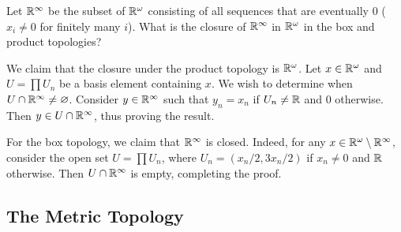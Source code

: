 	\begin{exercise}
		Let $\mathbb{R}^\infty$ be the subset of $\mathbb{R}^\omega$ consisting of all sequences that are eventually $0$ ($x_i\neq 0$ for finitely many $i$). What is the closure of $\mathbb{R}^\infty$ in $\mathbb{R}^\omega$ in the box and product topologies?
	\end{exercise}
	\begin{solution*}
		We claim that the closure under the product topology is $\mathbb{R}^\omega$. Let $x\in\mathbb{R}^\omega$ and $U=\prod U_n$ be a basis element containing $x$. We wish to determine when $U\cap\mathbb{R}^\infty\neq\varnothing$. Consider $y\in\mathbb{R}^\infty$ such that $y_n = x_n$ if $U_n\neq\mathbb{R}$ and $0$ otherwise. Then $y\in U\cap\mathbb{R}^\infty$, thus proving the result.

		For the box topology, we claim that $\mathbb{R}^\infty$ is closed. Indeed, for any $x\in\mathbb{R}^\omega\setminus\mathbb{R}^\infty$, consider the open set $U=\prod U_n$, where $U_n=(x_n/2, 3x_n/2)$ if $x_n\neq 0$ and $\mathbb{R}$ otherwise. Then $U\cap\mathbb{R}^\infty$ is empty, completing the proof.
	\end{solution*}




\subsection{The Metric Topology}

